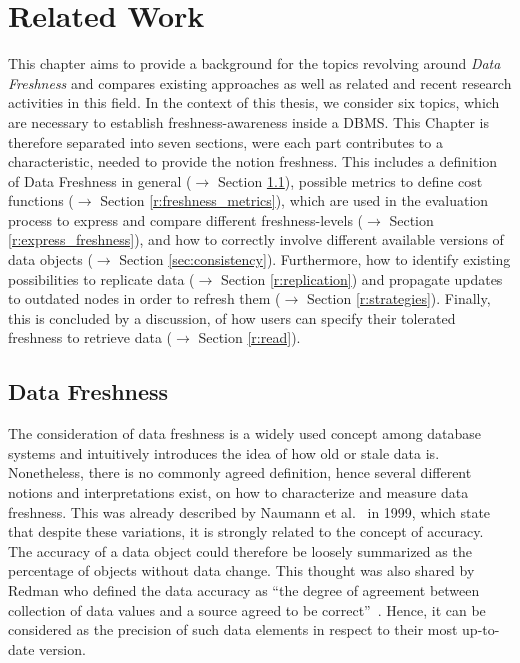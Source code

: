 \chapter{Related Work}
\label{c:related}



This chapter aims to provide a background for the topics revolving around \emph{Data Freshness} and compares existing approaches 
as well as related and recent research activities in this field. 
In the context of this thesis, we consider six topics, which are necessary to establish 
freshness-awareness inside a DBMS.
This Chapter is therefore separated into seven sections, were each part contributes to a characteristic, needed to 
provide the notion freshness. This includes a definition of Data Freshness in general ($\rightarrow$ Section \ref{sec:definition}), 
possible metrics to define cost functions ($\rightarrow$ Section \ref{r:freshness_metrics}), which are used
in the evaluation process to express and compare different freshness-levels ($\rightarrow$ Section \ref{r:express_freshness}), and
how to correctly involve different available versions of data objects ($\rightarrow$ Section \ref{sec:consistency}). 
Furthermore, how to identify existing possibilities to replicate data ($\rightarrow$ Section \ref{r:replication}) 
and propagate updates to outdated nodes in order to refresh them ($\rightarrow$ Section \ref{r:strategies}).
Finally, this is concluded by a discussion, of how users can specify their tolerated freshness to retrieve data ($\rightarrow$ Section \ref{r:read}).




\section{Data Freshness}
\label{sec:definition}
The consideration of data freshness is a widely used concept among database systems and intuitively introduces the idea of how old or stale data is.
Nonetheless, there is no commonly agreed definition, hence several different notions and interpretations exist, on how to characterize and measure data freshness.
This was already described by Naumann et al.~\cite{naumann:1999} in 1999, which state that despite these variations, it is strongly related to the concept of accuracy. 
The accuracy of a data object could therefore be loosely summarized as the percentage of objects without data change. 
This thought was also shared by Redman who defined the data accuracy as ``the degree of agreement between 
collection of data values and a source agreed to be correct''~\cite{redman:1996}.
Hence, it can be considered as the precision of such data elements in respect to their most up-to-date version.



